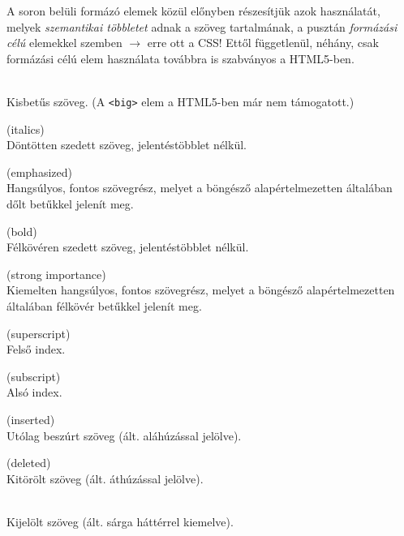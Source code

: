 \documentclass[usenames,dvipsnames,aspectratio=169]{beamer}
\begin{document}
\begin{frame}
  A soron belüli formázó elemek közül előnyben részesítjük azok használatát, melyek \emph{szemantikai többletet}
  adnak a szöveg tartalmának, a pusztán \emph{formázási célú} elemekkel szemben $\to$ erre ott a CSS!
  \vfill
  Ettől függetlenül, néhány, csak formázási célú elem használata továbbra is szabványos a HTML5-ben.
  \vfill
  \begin{description}[m]
    \item[\texttt{<small>}] \hfill \\ Kisbetűs szöveg. (A \texttt{<big>} elem a HTML5-ben már nem támogatott.)
    \item[\texttt{<i>}] (italics) \hfill \\ Döntötten szedett szöveg, jelentéstöbblet nélkül.
    \item[\texttt{<em>}] (emphasized) \hfill \\ Hangsúlyos, fontos szövegrész, melyet a böngésző alapértelmezetten általában dőlt betűkkel jelenít meg.
  \end{description}
\end{frame}

\begin{frame}
  \begin{description}[m]
    \small
    \item[\texttt{<b>}] (bold) \hfill \\ Félkövéren szedett szöveg, jelentéstöbblet nélkül.
    \item[\texttt{<strong>}] (strong importance) \hfill \\ Kiemelten hangsúlyos, fontos szövegrész, melyet a böngésző alapértelmezetten általában félkövér betűkkel jelenít meg.
    \item[\texttt{<sup>}] (superscript) \hfill \\ Felső index.
    \item[\texttt{<sub>}] (subscript) \hfill \\ Alsó index.
    \item[\texttt{<ins>}] (inserted) \hfill \\ Utólag beszúrt szöveg (ált. aláhúzással jelölve).
    \item[\texttt{<del>}] (deleted) \hfill \\ Kitörölt szöveg (ált. áthúzással jelölve).
    \item[\texttt{<mark>}] \hfill \\ Kijelölt szöveg (ált. sárga háttérrel kiemelve).
  \end{description}
\end{frame}
\end{document}
